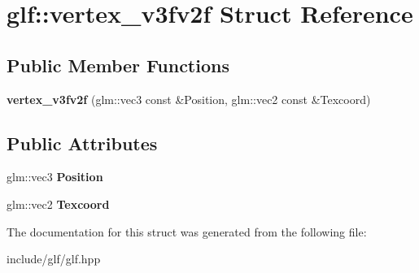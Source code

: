 \hypertarget{structglf_1_1vertex__v3fv2f}{\section{glf\-:\-:vertex\-\_\-v3fv2f \-Struct \-Reference}
\label{structglf_1_1vertex__v3fv2f}
}
\subsection*{\-Public \-Member \-Functions}
\begin{DoxyCompactItemize}
\item 
\hypertarget{structglf_1_1vertex__v3fv2f_ade3271f405e2e0ef2b81ba64d94c42af}{{\bfseries vertex\-\_\-v3fv2f} (glm\-::vec3 const \&\-Position, glm\-::vec2 const \&\-Texcoord)}\label{structglf_1_1vertex__v3fv2f_ade3271f405e2e0ef2b81ba64d94c42af}

\end{DoxyCompactItemize}
\subsection*{\-Public \-Attributes}
\begin{DoxyCompactItemize}
\item 
\hypertarget{structglf_1_1vertex__v3fv2f_a4b79b940f5c1b5a5e285fc4f00099d33}{glm\-::vec3 {\bfseries \-Position}}\label{structglf_1_1vertex__v3fv2f_a4b79b940f5c1b5a5e285fc4f00099d33}

\item 
\hypertarget{structglf_1_1vertex__v3fv2f_a7c2d96a701ab3fdad96ad6e0f1b5384e}{glm\-::vec2 {\bfseries \-Texcoord}}\label{structglf_1_1vertex__v3fv2f_a7c2d96a701ab3fdad96ad6e0f1b5384e}

\end{DoxyCompactItemize}


\-The documentation for this struct was generated from the following file\-:\begin{DoxyCompactItemize}
\item 
include/glf/glf.\-hpp\end{DoxyCompactItemize}
